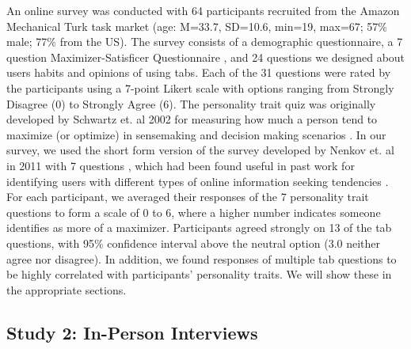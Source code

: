 An online survey was conducted with 64 participants recruited from the Amazon Mechanical Turk task market (age: M=33.7, SD=10.6, min=19, max=67; 57\% male; 77\% from the US). The survey consists of a demographic questionnaire, a 7 question Maximizer-Satisficer Questionnaire \cite{nenkov2008short}, and 24 questions we designed about users habits and opinions of using tabs. Each of the 31 questions were rated by the participants using a 7-point Likert scale with options ranging from Strongly Disagree (0) to Strongly Agree (6).  The personality trait quiz was originally developed by Schwartz et. al 2002 for measuring how much a person tend to maximize (or optimize) in sensemaking and decision making scenarios \cite{schwartz2002maximizing}. In our survey, we used the short form version of the survey developed by Nenkov et. al in 2011 with 7 questions \cite{nenkov2008short}, which had been found useful in past work for identifying users with different types of online information seeking tendencies \cite{kittur2013costs}. For each participant, we averaged their responses of the 7 personality trait questions to form a scale of 0 to 6, where a higher number indicates someone identifies as more of a maximizer. Participants agreed strongly on 13 of the tab questions, with 95\% confidence interval above the neutral option (3.0 neither agree nor disagree). In addition, we found responses of multiple tab questions to be highly correlated with participants' personality traits. We will show these in the appropriate sections.

\subsection{Study 2: In-Person Interviews}

